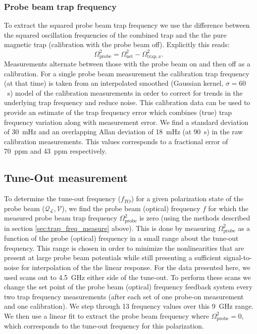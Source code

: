 \documentclass[%
 amsmath,amssymb,
aps,
]{revtex4-2}
\begin{document}
\subsubsection{Probe beam trap frequency}
To extract the squared probe beam trap frequency we use the difference between the squared oscillation frequencies of the combined trap and the the pure magnetic trap (calibration with the probe beam off). Explicitly this reads:
\begin{equation}
    \Omega_{\text{probe}}^{2}=\Omega_{\text{net}}^2 -\Omega_{\text{trap},x}^{2}.  
\end{equation}
Measurements alternate between those with the probe beam on and then off as a calibration.
For a single probe beam measurement the calibration trap frequency (at that time) is taken from an interpolated smoothed (Gaussian kernel, $\sigma=60$~s) model of the calibration measurements in order to correct for trends in the underlying trap frequency and reduce noise. 
This calibration data can be used to provide an estimate of the trap frequency error which combines (true) trap frequency variation along with measurement error. We find a standard deviation of 30~mHz and an overlapping Allan deviation of 18~mHz (at 90~s) in the raw calibration measurements. This values corresponds to a fractional error of 70~ppm and 43~ppm respectively.

\subsection{Tune-Out measurement}
To determine the tune-out frequency (\(f_{TO}\)) for a given polarization state of the probe beam (\( \mathcal{Q_{L}},\mathcal{V} \)), we find the probe beam (optical) frequency $f$ for which the measured probe beam trap frequency \(\Omega_{\text{probe}}^2\) is zero (using the methods described in section \ref{sec:trap_freq_measure} above). 
This is done by measuring \(\Omega_{\text{probe}}^2\) as a function of the probe (optical) frequency in a small range about the tune-out frequency. 
This range is chosen in order to minimize the nonlinearities that are present at large probe beam potentials while still presenting a sufficient signal-to-noise for interpolation of the the linear response. For the data presented here, we used scans out to 4.5~GHz either side of the tune-out.
To perform these scans we change the set point of the probe beam (optical) frequency feedback system every two trap frequency measurements (after each set of one probe-on measurement and one calibration). We step through 13 frequency values over this 9~GHz range. We then use a linear fit to extract the probe beam frequency where \(\Omega_{\text{probe}}^2=0\), which corresponds to the tune-out frequency for this polarization.
\end{document}
